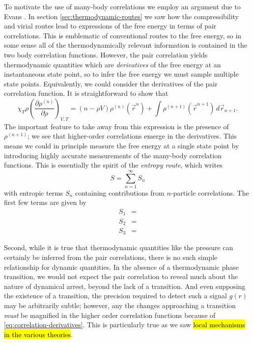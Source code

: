 To motivate the use of many-body correlations we employ an argument due to Evans \cite{EvansPrivate2019}.
In section \ref{sec:thermodynamic-routes} we saw how the compressibility and virial routes lead to expressions of the free energy in terms of pair correlations.
This is emblematic of conventional routes to the free energy, so in some sense all of the thermodynamically relevant information is contained in the two body correlation functions.
However, the pair correlation yields thermodynamic quantities which are \emph{derivatives} of the free energy at an instantaneous state point, so to infer the free energy we must sample multiple state points.
Equivalently, we could consider the derivatives of the pair correlation function.
It is straightforward to show that \cite{Santos2016}
\begin{equation}\label{eq:correlation-derivatives}
  \chi_T \rho
  \left( \frac{\partial \rho^{(n)}}{\partial \rho} \right)_{V,T}
  =
  (n - \rho V) \rho^{(n)}(\vec{r}^n)
  + \int \rho^{(n+1)}(\vec{r}^{n+1}) \, d\vec{r}_{n+1}.
\end{equation}
The important feature to take away from this expression is the presence of $\rho^{(n+1)}$; we see that higher-order correlations emerge in the derivatives.
This means we could in principle measure the free energy at a single state point by introducing highly accurate measurements of the many-body correlation functions.
This is essentially the spirit of the \emph{entropy route}, which writes \cite{WallaceJCP1987}
\begin{equation}
  S = \sum_{n=1}^\infty S_n
\end{equation}
with entropic terms $S_n$ containing contributions from $n$-particle correlations.
The first few terms are given by
\begin{subequations}
  \begin{align}
    S_1
    &=
    \\
    S_2
    &=
    \\
    S_3
    &=
  \end{align}
\end{subequations}

Second, while it is true that thermodynamic quantities like the pressure can certainly be inferred from the pair correlations, there is no such simple relationship for dynamic quantities.
In the absence of a thermodynamic phase transition, we would not expect the pair correlation to reveal much about the nature of dynamical arrest, beyond the lack of a transition.
And even supposing the existence of a transition, the precision required to detect such a signal $g(r)$ may be arbitrarily subtle; however, any the changes approaching a transition \emph{must} be magnified in the higher order correlation functions because of \eqref{eq:correlation-derivatives}.
This is particularly true as we saw \hl{local mechanisms in the various theories}.

